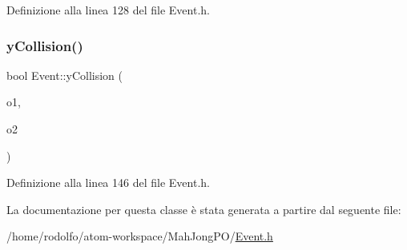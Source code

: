 Definizione alla linea 128 del file Event.\+h.

\mbox{\label{class_event_a6c8a0a72741f728ad6d6126dd7ae08f5}} 
\subsubsection{\texorpdfstring{y\+Collision()}{yCollision()}}
{\footnotesize\ttfamily bool Event\+::y\+Collision (\begin{DoxyParamCaption}\item[{\hyperlink{class_game_object}{Game\+Object} $\ast$}]{o1,  }\item[{\hyperlink{class_game_object}{Game\+Object} $\ast$}]{o2 }\end{DoxyParamCaption})\hspace{0.3cm}{\ttfamily [inline]}}



Definizione alla linea 146 del file Event.\+h.



La documentazione per questa classe è stata generata a partire dal seguente file\+:\begin{DoxyCompactItemize}
\item 
/home/rodolfo/atom-\/workspace/\+Mah\+Jong\+P\+O/\hyperlink{_event_8h}{Event.\+h}\end{DoxyCompactItemize}
